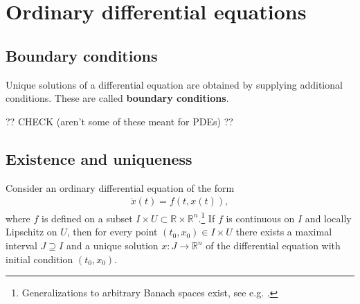 \chapter{Ordinary differential equations}

\section{Boundary conditions}

    Unique solutions of a differential equation are obtained by supplying additional conditions. These are called \textbf{boundary conditions}.




    ?? CHECK (aren't some of these meant for PDEs) ??

\section{Existence and uniqueness}

    \begin{theorem}\label{ode:picard_lindelof}
        Consider an ordinary differential equation of the form
        \begin{gather}
            \dot{x}(t) = f(t,x(t)),
        \end{gather}
        where $f$ is defined on a subset $I\times U\subset\mathbb{R}\times\mathbb{R}^n$.\footnote{Generalizations to arbitrary Banach spaces exist, see e.g. \cite{AMP1}.} If $f$ is continuous on $I$ and locally Lipschitz on $U$, then for every point $(t_0,x_0)\in I\times U$ there exists a maximal interval $J\supseteq I$ and a unique solution $x:J\rightarrow\mathbb{R}^n$ of the differential equation with initial condition $(t_0,x_0)$.
    \end{theorem}

